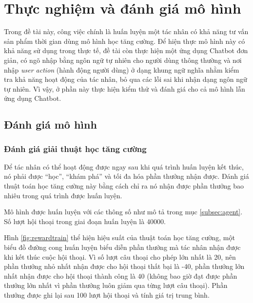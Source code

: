 \chapter {Thực nghiệm và đánh giá mô hình}

Trong đề tài này, công việc chính là huấn luyện một tác nhân có
khả năng tư vấn sản phẩm thời gian dùng mô hình học tăng cường.
Để hiện thực mô hình này có khả năng sử dụng trong thực tế, đề tài
còn thực hiện một ứng dụng Chatbot đơn giản, có ngõ nhập bằng
ngôn ngữ tự nhiên cho người dùng thông thường và nơi nhập
\textit{user action} (hành động người dùng) ở dạng khung ngữ nghĩa
nhằm kiểm tra khả năng hoạt động của tác nhân, bỏ qua các lỗi sai
khi nhận dạng ngôn ngữ tự nhiên. Vì vậy, ở phần này thực hiện
kiểm thử và đánh giá cho cả mô hình lẫn ứng dụng Chatbot.

\section{Đánh giá mô hình}

\subsection{Đánh giá giải thuật học tăng cường}
Để tác nhân có thể hoạt động được ngay sau khi quá trình huấn luyện
kết thúc, nó phải được \enquote{học}, \enquote{khám phá} và tối đa hóa
phần thưởng nhận được. Đánh giá thuật toán học tăng cường này bằng cách
chỉ ra nó nhận được phần thưởng bao nhiêu trong quá trình được huấn luyện.

Mô hình được huấn luyện với các thông số như mô tả trong mục \ref{subsec:agent}.
Số lượt hội thoại trong giai đoạn huấn luyện là 40000.

Hình \ref{fig:rewardtrain} thể hiện hiệu suất của thuật toán
học tăng cường, một biểu đồ đường cong huấn luyện biểu diễn
phần thưởng mà tác nhân nhận được khi kết thúc cuộc hội thoại.
Vì số lượt câu thoại cho phép lớn nhất là 20, nên phần thưởng
nhỏ nhất nhận được cho hội thoại thất bại là -40, phần thưởng
lớn nhất nhận được cho hội thoại thành công là 40 (không bao giờ
đạt được phần thưởng lớn nhất vì phần thưởng luôn giảm qua
từng lượt câu thoại). Phần thưởng được ghi lại sau 100 lượt
hội thoại và tính giá trị trung bình.

